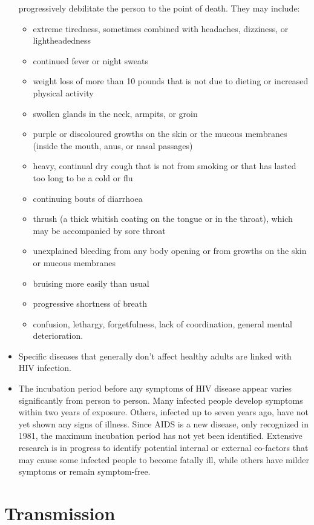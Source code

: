 \begin{itemize}
progressively debilitate the person to the point of death. They may include:
	\begin{itemize}
	\item extreme tiredness, sometimes combined with headaches, dizziness, or
lightheadedness
	\item continued fever or night sweats
	\item weight loss of more than 10 pounds that is not due to dieting or increased physical
activity
	\item swollen glands in the neck, armpits, or groin
	\item purple or discoloured growths on the skin or the mucous membranes (inside the
mouth, anus, or nasal passages)
	\item heavy, continual dry cough that is not from smoking or that has lasted too long to be a
cold or flu
	\item continuing bouts of diarrhoea
	\item thrush (a thick whitish coating on the tongue or in the throat), which may be
accompanied by sore throat
	\item unexplained bleeding from any body opening or from growths on the skin or mucous
membranes
	\item bruising more easily than usual
	\item progressive shortness of breath
	\item confusion, lethargy, forgetfulness, lack of coordination, general mental deterioration.
	\end{itemize}
\item Specific diseases that generally don't affect healthy adults are linked with HIV infection.
\item The incubation period before any symptoms of HIV disease appear varies significantly
from person to person. Many infected people develop symptoms within two years of
exposure. Others, infected up to seven years ago, have not yet shown any signs of illness.
Since AIDS is a new disease, only recognized in 1981, the maximum incubation period
has not yet been identified. Extensive research is in progress to identify potential internal
or external co-factors that may cause some infected people to become fatally ill, while
others have milder symptoms or remain symptom-free.
\end{itemize}

\section{Transmission}

